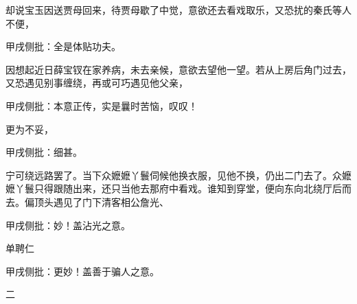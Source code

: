 \begin{parag}
    却说宝玉因送贾母回来，待贾母歇了中觉，意欲还去看戏取乐，又恐扰的秦氏等人不便，\begin{note}甲戌侧批：全是体贴功夫。\end{note}因想起近日薛宝钗在家养病，未去亲候，意欲去望他一望。若从上房后角门过去，又恐遇见别事缠绕，再或可巧遇见他父亲，\begin{note}甲戌侧批：本意正传，实是曩时苦恼，叹叹！\end{note}更为不妥，\begin{note}甲戌侧批：细甚。\end{note}宁可绕远路罢了。当下众嬷嬷丫鬟伺候他换衣服，见他不换，仍出二门去了。众嬷嬷丫鬟只得跟随出来，还只当他去那府中看戏。谁知到穿堂，便向东向北绕厅后而去。偏顶头遇见了门下清客相公詹光、\begin{note}甲戌侧批：妙！盖沾光之意。\end{note}单聘仁\begin{note}甲戌侧批：更妙！盖善于骗人之意。\end{note}二
\end{parag}
